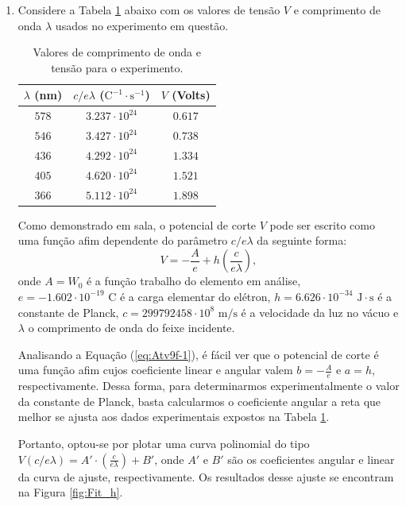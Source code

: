 \documentclass[12pt,a4paper]{article}
\begin{document}
\begin{enumerate}[label = \alph*)]
        

        \item Considere a Tabela \ref{tab:Atv9f} abaixo com os valores de tensão $V$ e comprimento de onda $\lambda$ usados no experimento em questão.
        \begin{table}[htp!]
            \centering
            \caption{Valores de comprimento de onda e tensão para o experimento.}
            \begin{tabular}{|c|c|c|}
            \hline
                 $\lambda$ (nm) & $c/e\lambda$ ($\text{C}^{-1}\cdot\text{s}^{-1}$) & $V$ (Volts) \\
                 \hline
                 $578$ & $3.237\cdot10^{24}$ & $0.617$ \\
                 $546$ & $3.427\cdot10^{24}$ & $0.738$ \\
                 $436$ & $4.292\cdot10^{24}$ & $1.334$ \\
                 $405$ & $4.620\cdot10^{24}$ & $1.521$ \\
                 $366$ & $5.112\cdot10^{24}$ & $1.898$ \\
                 \hline 
            \end{tabular}
            \label{tab:Atv9f}
        \end{table}

        Como demonstrado em sala, o potencial de corte $V$ pode ser escrito como uma função afim dependente do parâmetro $c/e\lambda$ da seguinte forma:
        \begin{equation}\label{eq:Atv9f-1}
            V=-\frac{A}{e}+h\left(\frac{c}{e\lambda}\right),
        \end{equation}
        onde $A=W_0$ é a função trabalho do elemento em análise, $e=-1.602\cdot10^{-19}\text{ C}$ é a carga elementar do elétron, $h=6.626\cdot10^{-34}\text{ J}\cdot\text{s}$ é a constante de Planck, $c=299792458\cdot10^{8}\text{ m/s}$ é a velocidade da luz no vácuo e $\lambda$ o comprimento de onda do feixe incidente.

        Analisando a Equação (\ref{eq:Atv9f-1}), é fácil ver que o potencial de corte é uma função afim cujos coeficiente linear e angular valem $b=-\frac{A}{e}$ e $a=h$, respectivamente. Dessa forma, para determinarmos experimentalmente o valor da constante de Planck, basta calcularmos o coeficiente angular a reta que melhor se ajusta aos dados experimentais expostos na Tabela \ref{tab:Atv9f}.

        Portanto, optou-se por plotar uma curva polinomial do tipo $V(c/e\lambda)=A'\cdot\left(\frac{c}{e\lambda}\right)+B'$, onde $A'$ e $B'$ são os coeficientes angular e linear da curva de ajuste, respectivamente. Os resultados desse ajuste se encontram na Figura \ref{fig:Fit_h}.


\end{enumerate}
\end{document}
